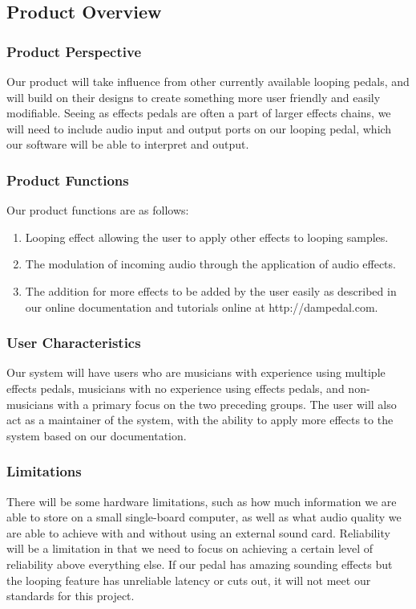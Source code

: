 \subsection{Product Overview}
    \subsubsection{Product Perspective}
    Our product will take influence from other currently available looping pedals, and will build on their designs to create something more user friendly and easily modifiable. 
    Seeing as effects pedals are often a part of larger effects chains, we will need to include audio input and output ports on our looping pedal, which our software will be able to interpret and output. 
    
    \subsubsection{Product Functions}
    Our product functions are as follows:
    \begin{enumerate}[label=\alph*.]
        \item Looping effect allowing the user to apply other effects to looping samples.
        \item The modulation of incoming audio through the application of audio effects.
        \item The addition for more effects to be added by the user easily as described in our online documentation and tutorials online at http://dampedal.com.
    \end{enumerate}
    
    \subsubsection{User Characteristics}
    Our system will have users who are musicians with experience using multiple effects pedals, musicians with no experience using effects pedals, and non-musicians with a primary focus on the two preceding groups. The user will also act as a maintainer of the system, with the ability to apply more effects to the system based on our documentation. 
    
    \subsubsection{Limitations}
    There will be some hardware limitations, such as how much information we are able to store on a small single-board computer, as well as what audio quality we are able to achieve with and without using an external sound card. Reliability will be a limitation in that we need to focus on achieving a certain level of reliability above everything else. If our pedal has amazing sounding effects but the looping feature has unreliable latency or cuts out, it will not meet our standards for this project. 
    


